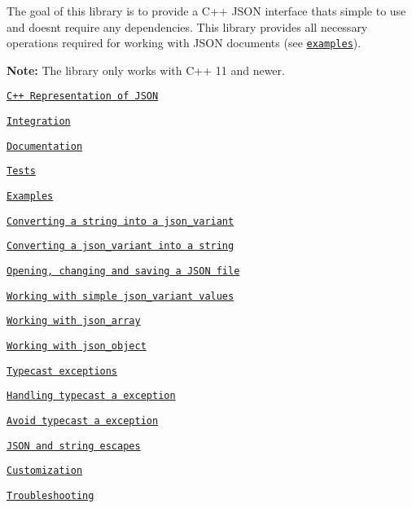 The goal of this library is to provide a C++ J\+S\+ON interface that\textquotesingle{}s simple to use and doesn\textquotesingle{}t require any dependencies. This library provides all necessary operations required for working with J\+S\+ON documents (see \href{#expamles_section}{\tt examples}).

{\bfseries Note\+:} The library only works with C++ 11 and newer.


\begin{DoxyItemize}
\item \href{#cpp_representation_section}{\tt C++ Representation of J\+S\+ON}
\item \href{#integration_section}{\tt Integration}
\item \href{#doc_section}{\tt Documentation}
\item \href{#tests_section}{\tt Tests}
\item \href{#expamles_section}{\tt Examples}
\begin{DoxyItemize}
\item \href{#convert_a_string_to_json_section}{\tt Converting a string into a json\+\_\+variant}
\item \href{#convert_a_json_to_string_section}{\tt Converting a json\+\_\+variant into a string}
\item \href{#opening_changing_section}{\tt Opening, changing and saving a J\+S\+ON file}
\item \href{#working_with_simple_section}{\tt Working with simple json\+\_\+variant values}
\item \href{#working_with_json_array_section}{\tt Working with json\+\_\+array}
\item \href{#working_with_json_object_section}{\tt Working with json\+\_\+object}
\item \href{#typecast_exceptions_section}{\tt Typecast exceptions}
\begin{DoxyItemize}
\item \href{#handling_typecast_expception_section}{\tt Handling typecast a exception}
\item \href{#avoid_typecast_exception_section}{\tt Avoid typecast a exception}
\end{DoxyItemize}
\item \href{#json_and_string_escapes_section}{\tt J\+S\+ON and string escapes}
\end{DoxyItemize}
\item \href{#customization_section}{\tt Customization}
\item \href{#troubleshooting_section}{\tt Troubleshooting}
\end{DoxyItemize}

